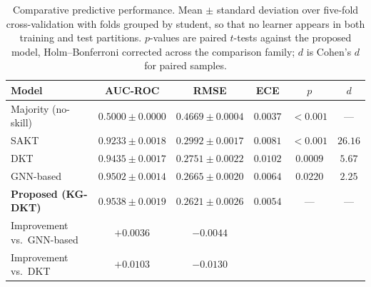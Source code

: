 %
%
%
%
%
%


\begin{table}[t]
\centering
\caption{Comparative predictive performance. Mean $\pm$ standard deviation over
five-fold cross-validation with folds grouped by student, so that no learner appears
in both training and test partitions. $p$-values are paired $t$-tests against the
proposed model, Holm--Bonferroni corrected across the comparison family; $d$ is
Cohen's $d$ for paired samples.}
\label{tab:accuracy}
\begin{tabular}{lccccc}
\toprule
Model & AUC-ROC & RMSE & ECE & $p$ & $d$ \\
\midrule
Majority (no-skill)          & $0.5000 \pm 0.0000$ & $0.4669 \pm 0.0004$ & $0.0037$ & $<0.001$ & --- \\
SAKT \cite{pandey2019sakt}   & $0.9233 \pm 0.0018$ & $0.2992 \pm 0.0017$ & $0.0081$ & $<0.001$ & $26.16$ \\
DKT \cite{piech2015dkt}      & $0.9435 \pm 0.0017$ & $0.2751 \pm 0.0022$ & $0.0102$ & $0.0009$ & $5.67$ \\
GNN-based                    & $0.9502 \pm 0.0014$ & $0.2665 \pm 0.0020$ & $0.0064$ & $0.0220$ & $2.25$ \\
\textbf{Proposed (KG-DKT)}   & $\mathbf{0.9538 \pm 0.0019}$ & $\mathbf{0.2621 \pm 0.0026}$ & $\mathbf{0.0054}$ & --- & --- \\
\midrule
Improvement vs.\ GNN-based   & $+0.0036$ & $-0.0044$ & & & \\
Improvement vs.\ DKT         & $+0.0103$ & $-0.0130$ & & & \\
\bottomrule
\end{tabular}
\end{table}


